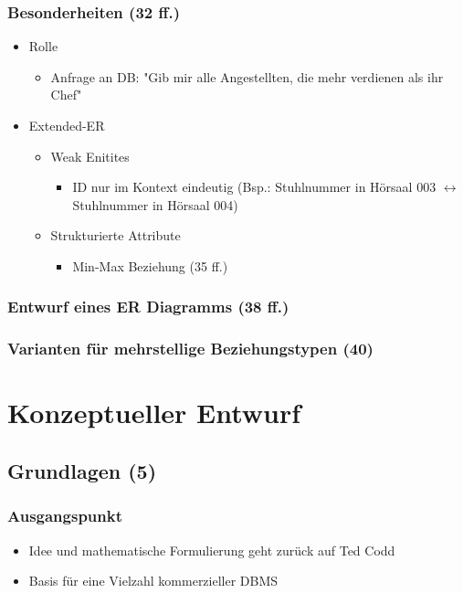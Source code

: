 \subsubsection{Besonderheiten (32 ff.)}
	\begin{itemize}
		\item Rolle
		\begin{itemize}
			\item Anfrage an DB: "Gib mir alle Angestellten, die mehr verdienen als ihr Chef"
		\end{itemize}
		\item Extended-ER
		\begin{itemize}
			\item Weak Enitites
			\begin{itemize}
				\item ID nur im Kontext eindeutig (Bsp.: Stuhlnummer in Hörsaal 003 \(\leftrightarrow\) Stuhlnummer in Hörsaal 004)
			\end{itemize}
			\item Strukturierte Attribute
			\begin{itemize}
				\item Min-Max Beziehung (35 ff.)
			\end{itemize}
			
		\end{itemize}
	\end{itemize}
\subsubsection{Entwurf eines ER Diagramms (38 ff.)}
\subsubsection{Varianten für mehrstellige Beziehungstypen (40)}
\section{Konzeptueller Entwurf}
\subsection{Grundlagen (5)}
\subsubsection{Ausgangspunkt}
\begin{itemize}
	\item Idee und mathematische Formulierung geht zurück auf Ted Codd
	\item Basis für eine Vielzahl kommerzieller DBMS
\end{itemize}

